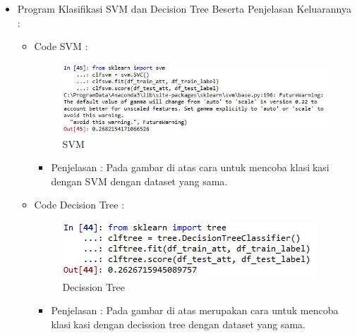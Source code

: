 \begin{enumerate}
\begin{itemize}
\begin{itemize}
\par
\par
\item Program Klasifikasi SVM dan Decision Tree Beserta Penjelasan Keluarannya :
\begin{itemize}
\item Code SVM :
\par
\begin{figure}[ht]
\centering
\includegraphics[scale=0.7]{figures/cod25.jpg}
\caption{SVM}
\label{contoh}
\end{figure}
\par
\begin{itemize}
\item Penjelasan : Pada gambar di atas cara untuk mencoba klasikasi dengan SVM dengan dataset yang sama.
\par 
\par
\end{itemize}
\item Code Decision Tree :
\par
\begin{figure}[ht]
\centering
\includegraphics[scale=0.7]{figures/cod24.jpg}
\caption{Decission Tree}
\label{contoh}
\end{figure}
\par
\begin{itemize}
\item Penjelasan : Pada gambar di atas merupakan cara untuk mencoba klasikasi dengan decission tree dengan dataset yang sama.
\par
\par
\end{itemize}
\end{itemize}




\end{itemize}
\end{itemize}
\end{enumerate}
